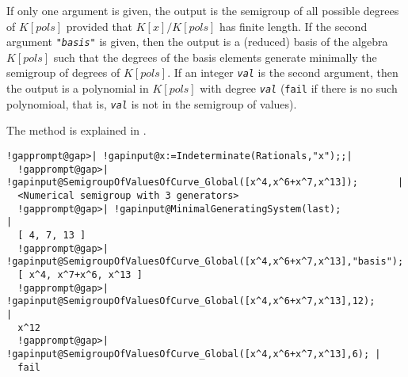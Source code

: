 \documentclass[a4paper,11pt]{report}
\begin{document}
{{{ If only one argument is given, the output is the semigroup of all possible
degrees of $K[pols]$ provided that $K[x]/K[pols]$ has finite length. If the second argument \mbox{\texttt{\mdseries\slshape "basis"}} is given, then the output is a (reduced) basis of the algebra $K[pols]$ such that the degrees of the basis elements generate minimally the semigroup
of degrees of $K[pols]$. If an integer \mbox{\texttt{\mdseries\slshape val}} is the second argument, then the output is a polynomial in $K[pols]$ with degree \mbox{\texttt{\mdseries\slshape val}} (\texttt{fail} if there is no such polynomioal, that is, \mbox{\texttt{\mdseries\slshape val}} is not in the semigroup of values).

 The method is explained in \cite{AGSM14}. 
\begin{Verbatim}[commandchars=!@|,fontsize=\small,frame=single,label=Example]
  !gapprompt@gap>| !gapinput@x:=Indeterminate(Rationals,"x");;|
  !gapprompt@gap>| !gapinput@SemigroupOfValuesOfCurve_Global([x^4,x^6+x^7,x^13]);       |
  <Numerical semigroup with 3 generators>
  !gapprompt@gap>| !gapinput@MinimalGeneratingSystem(last);                             |
  [ 4, 7, 13 ]
  !gapprompt@gap>| !gapinput@SemigroupOfValuesOfCurve_Global([x^4,x^6+x^7,x^13],"basis");|
  [ x^4, x^7+x^6, x^13 ]
  !gapprompt@gap>| !gapinput@SemigroupOfValuesOfCurve_Global([x^4,x^6+x^7,x^13],12);     |
  x^12
  !gapprompt@gap>| !gapinput@SemigroupOfValuesOfCurve_Global([x^4,x^6+x^7,x^13],6); |
  fail
\end{Verbatim}
 }

 }

 }

 
\end{document}
